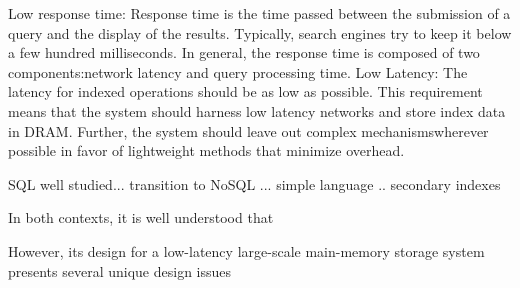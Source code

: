
Low response time:
Response time is the time passed between the submission of a query and the display of the results.
Typically, search engines try to keep it below a few hundred milliseconds. In general, the response time is composed of two components:network latency and query processing time.
Low Latency: The latency for indexed operations should be as low as possible. 
This requirement  means  that  the  system  should  harness  low  latency  networks  and  store index  data  in  DRAM.  Further,  the  system  should  leave  out  complex  mechanismswherever possible in favor of lightweight methods that minimize overhead.







SQL well studied...
transition to NoSQL ... simple language .. secondary indexes

In both contexts, it is well understood that

However, its design for a low-latency large-scale main-memory storage system presents several unique design issues



